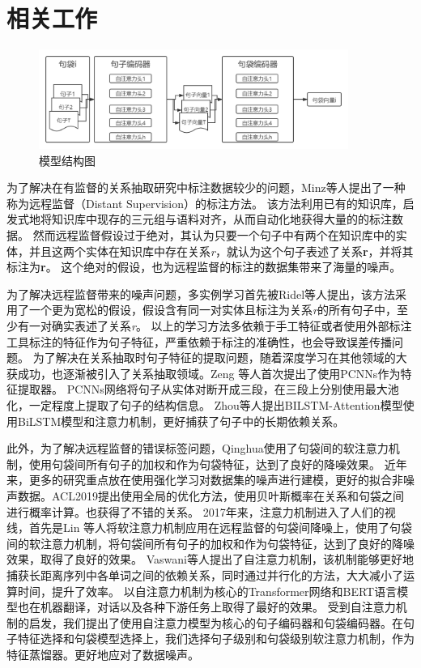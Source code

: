 \documentclass[UTF8]{csoarticle}
\begin{document}
\section{相关工作}
\begin{figure}[ht]
\centering
\includegraphics[width=0.9\textwidth]{structure.png} 
\caption{模型结构图}
\label{fig:fig1}
\end{figure}
为了解决在有监督的关系抽取研究中标注数据较少的问题，Minz\cite{bib1}等人提出了一种称为远程监督（Distant Supervision）的标注方法。
该方法利用已有的知识库，启发式地将知识库中现存的三元组与语料对齐，从而自动化地获得大量的的标注数据。
然而远程监督假设过于绝对，其认为只要一个句子中有两个在知识库中的实体，并且这两个实体在知识库中存在关系\textit{r}，就认为这个句子表述了关系\textbf{r}，并将其标注为\textbf{r}。
这个绝对的假设，也为远程监督的标注的数据集带来了海量的噪声。

为了解决远程监督带来的噪声问题，多实例学习首先被Ridel\cite{bib2}等人提出，该方法采用了一个更为宽松的假设，假设含有同一对实体且标注为关系\textit{r}的所有句子中，至少有一对确实表述了关系\textit{r}。
以上的学习方法多依赖于手工特征或者使用外部标注工具标注的特征作为句子特征，严重依赖于标注的准确性，也会导致误差传播问题。
为了解决在关系抽取时句子特征的提取问题，随着深度学习在其他领域的大获成功，也逐渐被引入了关系抽取领域。Zeng\cite{bib3} 等人首次提出了使用PCNNs作为特征提取器。
PCNNs网络将句子从实体对断开成三段，在三段上分别使用最大池化，一定程度上提取了句子的结构信息。
Zhou\cite{bib7}等人提出BILSTM-Attention模型使用BiLSTM模型和注意力机制，更好捕获了句子中的长期依赖关系。

此外，为了解决远程监督的错误标签问题，Qinghua使用了句袋间的软注意力机制，使用句袋间所有句子的加权和作为句袋特征，达到了良好的降噪效果。
近年来，更多的研究重点放在使用强化学习对数据集的噪声进行建模，更好的拟合非噪声数据。ACL2019提出使用全局的优化方法，使用贝叶斯概率在关系和句袋之间进行概率计算。也获得了不错的关系。
2017年来，注意力机制进入了人们的视线，首先是Lin \cite{bib4}等人将软注意力机制应用在远程监督的句袋间降噪上，使用了句袋间的软注意力机制，将句袋间所有句子的加权和作为句袋特征，达到了良好的降噪效果，取得了良好的效果。
Vaswani\cite{bib5}等人提出了自注意力机制，该机制能够更好地捕获长距离序列中各单词之间的依赖关系，同时通过并行化的方法，大大减小了运算时间，提升了效率。
以自注意力机制为核心的Transformer网络和BERT语言模型也在机器翻译，对话以及各种下游任务上取得了最好的效果。
受到自注意力机制的启发，我们提出了使用自注意力模型为核心的句子编码器和句袋编码器。在句子特征选择和句袋模型选择上，我们选择句子级别和句袋级别软注意力机制，作为特征蒸馏器。更好地应对了数据噪声。
\end{document}
